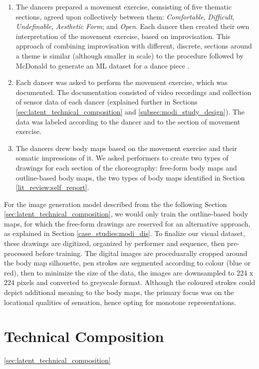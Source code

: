 \begin{enumerate}
    \item  The dancers prepared a movement exercise, consisting of five thematic sections, agreed upon collectively between them: \textit{Comfortable}, \textit{Difficult}, \textit{Undefinable}, \textit{Aesthetic Form}; and \textit{Open}. Each dancer then created their own interpretation of the movement exercise, based on improvisation. This approach of combining improvisation with different, discrete, sections around a theme is similar (although smaller in scale) to the procedure followed by McDonald to generate an ML dataset for a dance piece \cite{mcdonald_dance_2018}.
    \item Each dancer was asked to perform the movement exercise, which was documented. The documentation consisted of video recordings and collection of sensor data of each dancer (explained further in Sections \ref{sec:latent_technical_composition} and \ref{subsec:modi_study_design}). The data was labeled according to the dancer and to the section of movement exercise.
    \item The dancers drew body maps based on the movement exercise and their somatic impressions of it. We asked performers to create two types of drawings for each section of the choreography: free-form body maps and outline-based body maps, the two types of body maps identified in Section \ref{lit_review:self_report}.
\end{enumerate}

For the image generation model described from the the following Section \ref{sec:latent_technical_composition}, we would only train the outline-based body maps, for which the free-form drawings are reserved for an alternative approach, as explained in Section \ref{case_studies:modi_dis}. To finalize our visual dataset, these drawings are digitized, organized by performer and sequence, then pre-processed before training. The digital images are proceduarally cropped around the body map silhouette, pen strokes are segmented according to colour (blue or red), then to minimize the size of the data, the images are downsampled to 224 x 224 pixels and converted to greyscale format. Although the coloured strokes could depict additional meaning to the body maps, the primary focus was on the locational qualities of sensation, hence opting for monotone representations.

\section{Technical Composition}
\ref{sec:latent_technical_composition}

